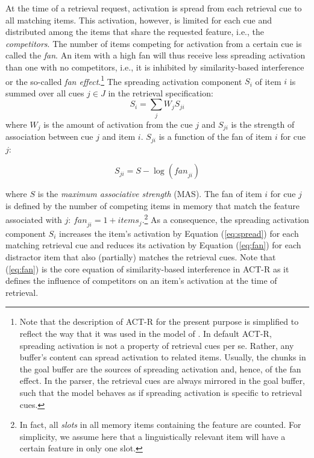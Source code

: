 \documentclass{cambridge7A}\usepackage[]{graphicx}\usepackage[]{color}
\begin{document}
At the time of a retrieval request, activation is spread from each retrieval cue to all matching items. This activation, however, is limited for each cue and distributed among the items that share the requested feature, i.e., the \emph{competitors}. The number of items competing for activation from a certain cue is called the \textit{fan}. An item with a high fan will thus receive less spreading activation than one with no competitors, i.e., it is inhibited by similarity-based interference or the so-called  \textit{fan effect}.\footnote{Note that the description of ACT-R for the present purpose is simplified to reflect the way that it was used in the model of \cite{LewisVasishth2005}. In default ACT-R, spreading activation is not a property of retrieval cues per se. Rather, any buffer's content can spread activation to related items. Usually, the chunks in the goal buffer are the sources of spreading activation and, hence, of the fan effect. In the \cite{LewisVasishth2005} parser, the retrieval cues are always mirrored in the goal buffer, such that the model behaves as if spreading activation is specific to retrieval cues.}
The spreading activation component $S_i$ of item $i$ is summed over all cues $j \in J$ in the retrieval specification: 
\begin{equation}\label{eq:spread}
	S_i = \sum_j W_{j} S_{ji}
\end{equation}
where $W_{j}$ is the amount of activation from the cue $j$ and $S_{ji}$ is the strength of association between cue $j$ and item $i$. $S_{ji}$ is a function of the fan of item $i$ for cue $j$:

\begin{equation}\label{eq:fan}
	S_{ji} = S - \log(\textit{fan}_{ji})
\end{equation}

where $S$ is the  \textit{maximum associative strength} (MAS). The fan of item $i$ for cue $j$ is defined by the number of competing items in memory that match the feature associated with $j$: $\textit{fan}_{ji} = 1+\textit{items}_j$.\footnote{In fact, all \textit{slots} in all memory items containing the feature are counted. For simplicity, we assume here that a linguistically relevant item will have a certain feature in only one slot.}
As a consequence, the spreading activation component $S_i$ increases the item's activation by Equation (\ref{eq:spread}) for each matching retrieval cue and reduces its activation by Equation (\ref{eq:fan}) for each distractor item that also (partially) matches the retrieval cues. Note that (\ref{eq:fan}) is the core equation of  similarity-based interference in ACT-R as it defines the influence of competitors on an item's activation at the time of retrieval.
\end{document}
